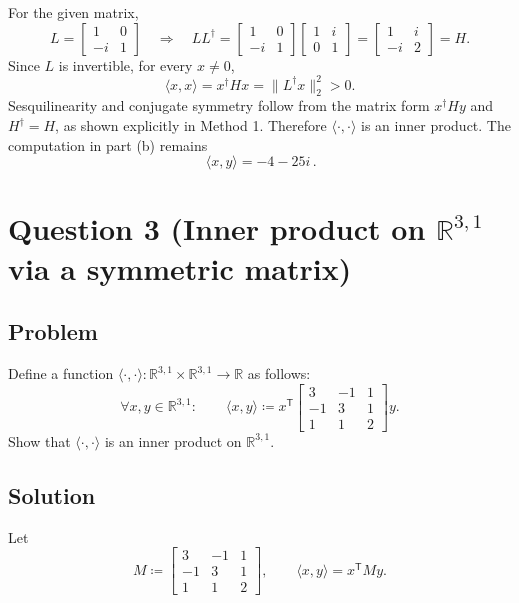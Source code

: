 \documentclass[12pt]{article}
\newcommand{\df}{\coloneqq}
\newcommand{\R}{\mathbb{R}}
\begin{document}
For the given matrix,
\[
L=
\begin{bmatrix}
1&0\\
-i&1
\end{bmatrix}
\quad\Longrightarrow\quad
LL^\dagger=
\begin{bmatrix}
1&0\\
-i&1
\end{bmatrix}
\begin{bmatrix}
1&i\\
0&1
\end{bmatrix}
=
\begin{bmatrix}
1&i\\
-i&2
\end{bmatrix}=H.
\]
Since $L$ is invertible, for every $x\neq 0$,
\[
\langle x,x\rangle=x^\dagger Hx=\|L^\dagger x\|_2^2>0.
\]
Sesquilinearity and conjugate symmetry follow from the matrix form $x^\dagger Hy$ and $H^\dagger=H$, as shown explicitly in Method 1. Therefore $\langle\cdot,\cdot\rangle$ is an inner product. The computation in part (b) remains
\[
\boxed{\,\langle x,y\rangle=-4-25i\,}.
\]

\newpage
\section{Question 3 (Inner product on $\R^{3,1}$ via a symmetric matrix)}
\subsection{Problem}
Define a function $\langle\cdot,\cdot\rangle : \R^{3,1}\times \R^{3,1}\to \R$ as follows:
\[
\forall x,y\in \R^{3,1}:\qquad
\langle x,y\rangle \df x^{\mathsf T}
\begin{bmatrix}
3 & -1 & 1\\
-1 & 3 & 1\\
1 & 1 & 2
\end{bmatrix}
y.
\]
Show that $\langle\cdot,\cdot\rangle$ is an inner product on $\R^{3,1}$.

\vspace{2cm}
\subsection{Solution}
Let
\[
M\df
\begin{bmatrix}
3 & -1 & 1\\
-1 & 3 & 1\\
1 & 1 & 2
\end{bmatrix},
\qquad
\langle x,y\rangle=x^{\mathsf T}My.
\]
\end{document}
